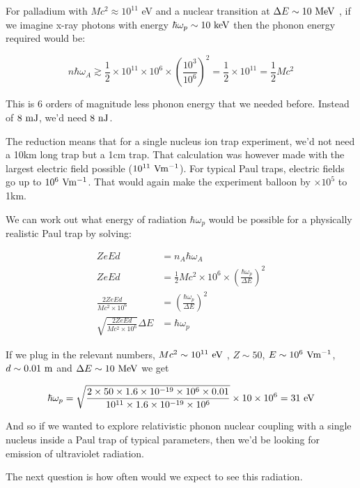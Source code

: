 \documentclass[
]{article}
\renewcommand{\[}{\begin{equation}}
\renewcommand{\]}{\end{equation}}
\begin{document}
For palladium with \(M c^2 \approx 10^{11}\) eV and a nuclear transition
at \(\Delta E \sim 10 \rm \ MeV\) , if we imagine x-ray photons with
energy \(\hbar\omega _p\sim 10 \rm \ keV\) then the phonon energy
required would be:

\[
n\hbar\omega_A \gtrsim \frac{1}{2}\times 10^{11} \times 10^6 \times \left(\frac{10^3}{10^6}\right)^2 = \frac{1}{2}\times 10^{11} = \frac{1}{2} Mc^2
\]

This is 6 orders of magnitude less phonon energy that we needed before.
Instead of \(8 \rm \ mJ\), we'd need \(8 \rm \ nJ\).

The reduction means that for a single nucleus ion trap experiment, we'd
not need a 10km long trap but a 1cm trap. That calculation was however
made with the largest electric field possible
(\(10^{11} \rm \ Vm^{-1}\)). For typical Paul traps, electric fields go
up to \(10^{6} \rm \ Vm^{-1}\). That would again make the experiment
balloon by \(\times 10^5\) to 1km.

We can work out what energy of radiation \(\hbar\omega_p\) would be
possible for a physically realistic Paul trap by solving:

\[
\begin{aligned}
ZeEd &= n_A\hbar\omega_A \\
ZeEd &= \frac{1}{2}Mc^2 \times 10^6 \times \left(\frac{\hbar\omega_p}{\Delta E}\right)^2 \\
\frac{2ZeEd}{Mc^2\times 10^6} &= \left(\frac{\hbar\omega_p}{\Delta E}\right)^2 \\
\sqrt{\frac{2ZeEd}{Mc^2\times 10^6}}\Delta E &= \hbar\omega_p
\end{aligned}
\]

If we plug in the relevant numbers, \(Mc^2\sim 10^{11} \rm \ eV\) ,
\(Z\sim 50\), \(E\sim 10^6 \rm \ Vm^{-1}\), \(d\sim 0.01 \rm \ m\) and
\(\Delta E \sim 10 \rm \ MeV\) we get

\[
\hbar\omega_p = \sqrt{\frac{2\times 50\times 1.6\times 10^{-19}\times 10^6\times 0.01}{10^{11}\times 1.6\times 10^{-19}\times 10^6}}\times 10\times 10^6 = 31\rm \ eV
\]

And so if we wanted to explore relativistic phonon nuclear coupling with
a single nucleus inside a Paul trap of typical parameters, then we'd be
looking for emission of ultraviolet radiation.

The next question is how often would we expect to see this radiation.

\printbibliography
\end{document}

